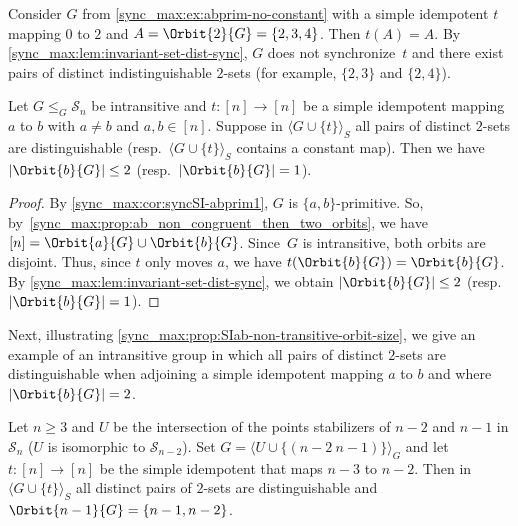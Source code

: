 	\begin{example}
		Consider $G$ from \cref{sync_max:ex:abprim-no-constant} 
		with a simple idempotent $t$ mapping $0$ to $2$
		and $A = \Orbit{2}{G} = \{2,3,4\}$.
		Then $t(A) = A$.
		By \cref{sync_max:lem:invariant-set-dist-sync},
		$G$ does not synchronize~$t$
		and there exist pairs of distinct indistinguishable $2$-sets (for example, $\{2,3\}$ and $\{2,4\}$).
	\end{example}

	\begin{lemma} \label{sync_max:prop:SIab-non-transitive-orbit-size}
		Let $G \le_G \mathcal S_n$ be intransitive
		and $t \colon [n] \to [n]$ be a simple idempotent
		mapping $a$ to $b$ with $a \ne b$ and $a,b \in [n]$.
		Suppose in $\langle G \cup \{t\} \rangle_S$
		all pairs of distinct $2$-sets are distinguishable (resp.~$\langle G \cup \{t\} \rangle_S$
		contains a constant map).
	    Then we have $|\Orbit{b}{G}| \le 2$ (resp.~$|\Orbit{b}{G}| = 1$).
	\end{lemma}
	\begin{proof}
		By \cref{sync_max:cor:syncSI-abprim1},
		$G$ is $\{a,b\}$-primitive.
		So, by~\cref{sync_max:prop:ab_non_congruent_then_two_orbits},
	we have $[n] = \Orbit{a}{G} \cup \Orbit{b}{G}$.
	Since~$G$ is intransitive, both orbits are disjoint.
	Thus, since $t$ only moves $a$,
	we have $t(\Orbit{b}{G}) = \Orbit{b}{G}$.
	By \cref{sync_max:lem:invariant-set-dist-sync},
	we obtain  $|\Orbit{b}{G}| \le 2$ (resp.~$|\Orbit{b}{G}| = 1$).	
	\end{proof} 

Next, illustrating \cref{sync_max:prop:SIab-non-transitive-orbit-size},
we give an example of an intransitive group
in which all pairs of distinct $2$-sets
are distinguishable when adjoining a simple idempotent
mapping $a$ to $b$ and where $|\Orbit{b}{G}| = 2$.

\begin{example}
	Let $n \ge 3$ and $U$ be the intersection of the points stabilizers of $n-2$ and $n - 1$ in $\mathcal S_n$ 
	($U$ is isomorphic to $\mathcal S_{n-2}$).
	Set $G = \langle U \cup \{ (n - 2 ~ n - 1) \} \rangle_G$
	and let $t \colon [n] \to [n]$ be the simple idempotent that maps $n-3$ to $n-2$.
	Then in $\langle G \cup \{t\} \rangle_S$
	all distinct pairs of $2$-sets are distinguishable
	and $\Orbit{n-1}{G} = \{n-1,n-2\}$.
\end{example}

